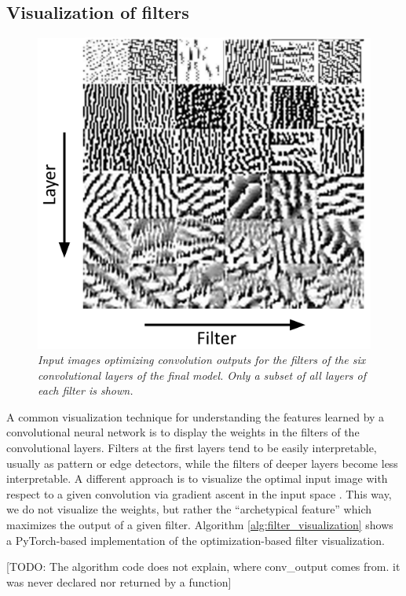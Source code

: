 \documentclass[a4paper]{article}
\begin{document}
\subsection{Visualization of filters}
\label{sec:filter_visualization}
\begin{figure}[t]
     \centering
     \includegraphics[width=.9\linewidth]{graphics/filters}
     \caption{\textit{Input images optimizing convolution outputs for the filters of the six convolutional layers of the final model. Only a subset of all layers of each filter is shown.}}
     \label{fig:filters}
\end{figure}
A common visualization technique for understanding the features learned by a convolutional neural network is to display the weights in the filters of the convolutional layers. Filters at the first layers tend to be easily interpretable, usually as pattern or edge detectors, while the filters of deeper layers become less interpretable. A different approach is to visualize the optimal input image with respect to a given convolution via gradient ascent in the input space \cite{Erhan2009}. This way, we do not visualize the weights, but rather the \enquote{archetypical feature} which maximizes the output of a given filter. Algorithm \ref{alg:filter_visualization} shows a PyTorch-based implementation of the optimization-based filter visualization.

[TODO: The algorithm code does not explain, where conv_output comes from. it was never declared nor returned by a function]
\end{document}
